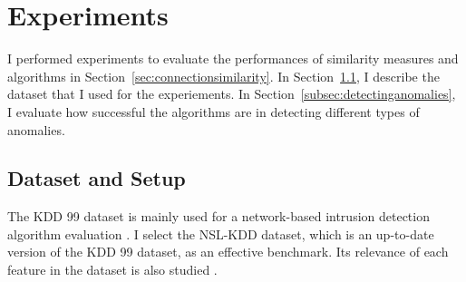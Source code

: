 \section{Experiments}
I performed experiments to evaluate the performances of similarity measures and algorithms in Section~\ref{sec:connectionsimilarity}.
\newline
In Section~\ref{subsec:datasetandsetup}, I describe the dataset that I used for the experiements.\newline
In Section~\ref{subsec:detectinganomalies}, I evaluate how successful the algorithms are in detecting different types of anomalies.

\subsection{Dataset and Setup}
\label{subsec:datasetandsetup}
The KDD 99 dataset is mainly used for a network-based intrusion detection algorithm evaluation \cite{tavallaee09}. 
I select the NSL-KDD dataset, which is an up-to-date version of the KDD 99 dataset, as an effective benchmark. 
Its relevance of each feature in the dataset is also studied \cite{olusola10} \cite{kayacik05}. 

